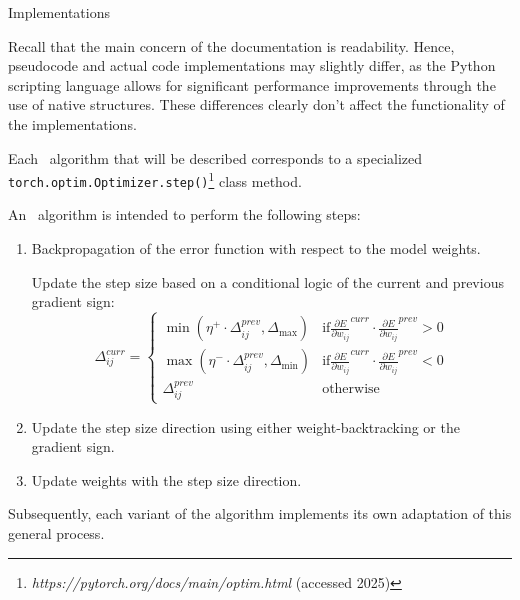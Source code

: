 \begin{section}{Implementations}
    \label{sec:implementations}
    \par Recall that the main concern of the documentation is readability. Hence, pseudocode and actual code implementations may slightly differ, as the Python scripting language allows for significant performance improvements through the use of native structures. These differences clearly don't affect the functionality of the implementations.
    \par Each~ algorithm that will be described corresponds to a specialized\\\texttt{torch.optim.Optimizer.step()}\footnote{\textit{https://pytorch.org/docs/main/optim.html} (accessed 2025)} class method.\\
    \par An~ algorithm is intended to perform the following steps:
    \begin{enumerate}
        \item Backpropagation of the error function with respect to the model weights.
        \begin{item}
            Update the step size based on a conditional logic of the current and previous gradient sign:
            \[
                \Delta_{ij}^{curr} =
                \begin{cases}
                    \min(\eta^{+} \cdot \Delta_{ij}^{prev}, \Delta_{\max}) & \text{if} {\frac{\partial E}{\partial w_{ij}}}^{curr} \cdot {\frac{\partial E}{\partial w_{ij}}}^{prev} > 0 \\[2ex]
                    \max(\eta^{-} \cdot \Delta_{ij}^{prev}, \Delta_{\min}) & \text{if} {\frac{\partial E}{\partial w_{ij}}}^{curr} \cdot {\frac{\partial E}{\partial w_{ij}}}^{prev} < 0 \\[2ex]
                    \Delta_{ij}^{prev} & \text{otherwise}
                \end{cases}
            \]
        \end{item}
        \item Update the step size direction using either weight-backtracking or the gradient sign.
        \item Update weights with the step size direction.
    \end{enumerate}
    Subsequently, each variant of the algorithm implements its own adaptation of this general process.
    \clearpage
    
    
    
    
\end{section}